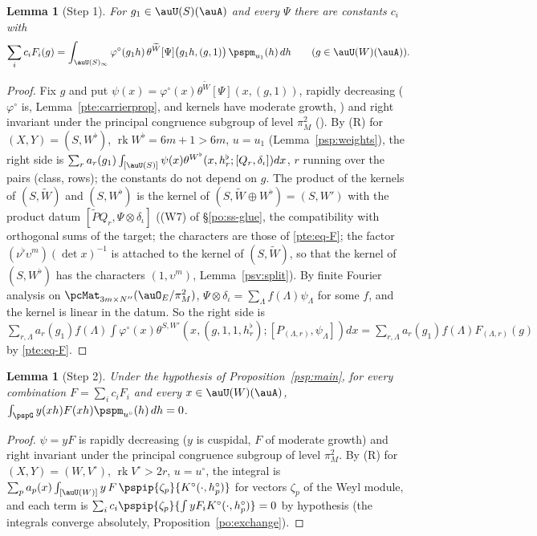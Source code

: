 \documentclass[10pt]{amsart}
\newtheorem{lemma}[theorem]{Lemma}
\theoremstyle{definition}
\theoremstyle{remark}
\begin{document}
\begin{lemma}[Step 1]\label{psp:step1}
For $g_1\in\auU(S)(\auA)$ and every $\Psi$ there are constants $c_i$ with
\[
\sum_ic_iF_i(g)=\int_{\auU(S)_\infty}\varphi^\circ(g_1h)\,\theta^{\widetilde W}[\Psi]\bigl(g_1h,(g,1)\bigr)
\,\pspm_{u_1}(h)\,dh\qquad(g\in\auU(W)(\auA)).
\]
\end{lemma}
\begin{proof}
Fix $g$ and put $\psi(x)=\varphi^\circ(x)\theta^{\widetilde W}[\Psi](x,(g,1))$, rapidly decreasing
($\varphi^\circ$ is, Lemma~\ref{pte:carrierprop}, and kernels have moderate growth, {\cite[Lemma~3.29]{P53}}) and right
invariant under the principal congruence subgroup of level $\pi_M^2$ ({\cite[Lemma~2.9]{P53}}). By (R)
for $(X,Y)=(S,W^\flat)$, $\operatorname{rk}W^\flat=6m+1>6m$, $u=u_1$ (Lemma~\ref{psp:weights}), the
right side is $\sum_ra_r(g_1)\int_{[\auU(S)]}\psi(x)\theta^{W^\flat}(x,h^\flat_r;[Q_r,\delta_\iota])dx$,
$r$ running over the pairs (class, rows); the constants do not depend on $g$. The product of the
kernels of $(S,\widetilde W)$ and $(S,W^\flat)$ is the kernel of $(S,\widetilde W\oplus W^\flat)=(S,W')$
with the product datum $[\widetilde PQ_r,\Psi\otimes\delta_\iota]$ ((W7) of \S\ref{po:ss-glue}, the
compatibility with orthogonal sums of the target; the characters are those of \eqref{pte:eq-F}; the factor
$(\nu^\flat\upsilon^m)(\det x)^{-1}$ is attached to the kernel of $(S,\widetilde W)$, so that the kernel of
$(S,W^\flat)$ has the characters $(1,\upsilon^m)$, Lemma~\ref{psv:split}). By
finite Fourier analysis on $\pcMat_{3m\times N''}(\auO_E/\pi_M^2)$, $\Psi\otimes\delta_\iota=\sum_\Lambda
f(\Lambda)\psi_\Lambda$ for some $f$, and the kernel is linear in the datum. So the right side is
$\sum_{r,\Lambda}a_r(g_1)f(\Lambda)\int\varphi^\circ(x)\theta^{S,W'}(x,(g,1,1,h^\flat_r);[P_{(\Lambda,r)},
\psi_\Lambda])dx=\sum_{r,\Lambda}a_r(g_1)f(\Lambda)F_{(\Lambda,r)}(g)$ by \eqref{pte:eq-F}.
\end{proof}

\begin{lemma}[Step 2]\label{psp:step2}
Under the hypothesis of Proposition~\ref{psp:main}, for every combination $F=\sum_ic_iF_i$ and every
$x\in\auU(W)(\auA)$, $\int_{\pspG}y(xh)F(xh)\pspm_{u^\circ}(h)\,dh=0$.
\end{lemma}
\begin{proof}
$\psi=yF$ is rapidly decreasing ($y$ is cuspidal, $F$ of moderate growth) and right invariant under
the principal congruence subgroup of level $\pi_M^2$. By (R) for $(X,Y)=(W,V^\circ)$,
$\operatorname{rk}V^\circ>2r$, $u=u^\circ$, the integral is $\sum_pa_p(x)\int_{[\auU(W)]}y\,F\,
\pspip{\zeta_p}{K^\circ(\cdot,h^\circ_p)}$ for vectors $\zeta_p$ of the Weyl module, and each term is
$\sum_ic_i\pspip{\zeta_p}{\int yF_iK^\circ(\cdot,h^\circ_p)}=0$ by hypothesis (the integrals converge
absolutely, Proposition~\ref{po:exchange}).
\end{proof}
\end{document}
